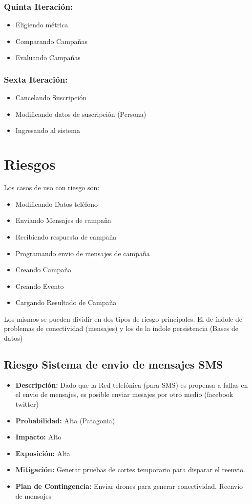 \documentclass[a4paper, 11pt]{article}
\begin{document}
\subsubsection{Quinta Iteraci\'on:}
\begin{itemize}
\item Eligiendo métrica
\item Comparando Campañas
\item Evaluando Campañas
\end{itemize}


\subsubsection{Sexta Iteraci\'on:}
\begin{itemize}
\item Cancelando Suscripci\'on
\item Modificando datos de suscripci\'on (Persona)
\item Ingresando al sistema
\end{itemize}


\section{Riesgos}

Los casos de uso con riesgo son:
\begin{itemize}
\item Modificando Datos teléfono
\item Enviando Mensajes de campaña
\item Recibiendo respuesta de campaña
\item Programando envio de mensajes de campaña
\item Creando Campaña
\item Creando Evento
\item Cargando Resultado de Campaña
\end{itemize}
Los mismos se pueden dividir en dos tipos de riesgo principales. El de índole de problemas de conectividad (mensajes) y los de la índole persistencia (Bases de datos)

\subsection{Riesgo Sistema de envio de mensajes SMS}
\begin{itemize}
\item \textbf{Descripci\'on:} Dado que la Red telefónica (para SMS) es propensa a fallas en el envio de mensajes, es posible enviar mesajes por otro medio (facebook twitter)
\item \textbf{Probabilidad:} Alta (Patagonia)
\item \textbf{Impacto:} Alto
\item \textbf{Exposici\'on:} Alta
\item \textbf{Mitigaci\'on:} Generar pruebas de cortes temporario para disparar el reenvio.
\item \textbf{Plan de Contingencia:} Enviar drones para generar conectividad. Reenvio de mensajes
\end{itemize}
\end{document}
